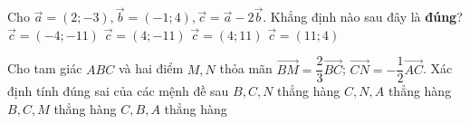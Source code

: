 \begin{ex}%
	Cho $\overrightarrow{a} = (2;-3), \overrightarrow{b} = (-1;4),  \overrightarrow{c} = \overrightarrow{a} - 2\overrightarrow{b}$. Khẳng định nào sau đây là \textbf{đúng}?
	\choice 
		{$\overrightarrow{c} =  (-4;-11)$}
		 {\True $\overrightarrow{c} = (4;-11)$}
		{$\overrightarrow{c} =  (4;11)$}
		 {$\overrightarrow{c} = (11;4)$}
\end{ex}



\begin{ex}%
	Cho tam giác $ABC$ và hai điểm $M, N$ thỏa mãn $\overrightarrow{BM}=\dfrac{2}{3}\overrightarrow{BC}$; $  \overrightarrow{CN}=-\dfrac{1}{2}\overrightarrow{AC}$. Xác định tính đúng sai của các mệnh đề sau
	\choiceTF 
		{$B, C, N$ thẳng  hàng}
		{\True $C, N, A$ thẳng  hàng}
		{\True $B, C, M$  thẳng hàng}
		{$C, B, A$  thẳng hàng}
\end{ex}



